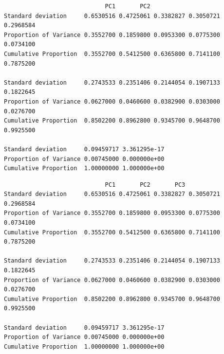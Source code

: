 \documentclass[
  letterpaper,
  DIV=11,
  numbers=noendperiod]{scrartcl}
\newenvironment{Shaded}{}{}
\newcommand{\CommentTok}[1]{\textcolor[rgb]{0.57,0.51,0.45}{#1}}
\newcommand{\FunctionTok}[1]{\textcolor[rgb]{0.41,0.62,0.42}{#1}}
\newcommand{\NormalTok}[1]{\textcolor[rgb]{0.24,0.22,0.21}{#1}}
\newcommand{\OtherTok}[1]{\textcolor[rgb]{0.41,0.62,0.42}{#1}}
\newcommand{\SpecialCharTok}[1]{\textcolor[rgb]{0.69,0.38,0.53}{#1}}
\begin{document}
\begin{verbatim}
                             PC1       PC2                              
Standard deviation     0.6530516 0.4725061 0.3382827 0.3050721 0.2968584
Proportion of Variance 0.3552700 0.1859800 0.0953300 0.0775300 0.0734100
Cumulative Proportion  0.3552700 0.5412500 0.6365800 0.7141100 0.7875200
                                                                        
Standard deviation     0.2743533 0.2351406 0.2144054 0.1907133 0.1822645
Proportion of Variance 0.0627000 0.0460600 0.0382900 0.0303000 0.0276700
Cumulative Proportion  0.8502200 0.8962800 0.9345700 0.9648700 0.9925500
                                              
Standard deviation     0.09459717 3.361295e-17
Proportion of Variance 0.00745000 0.000000e+00
Cumulative Proportion  1.00000000 1.000000e+00
\end{verbatim}

\begin{Shaded}
\end{Shaded}

\begin{verbatim}
                             PC1       PC2       PC3                    
Standard deviation     0.6530516 0.4725061 0.3382827 0.3050721 0.2968584
Proportion of Variance 0.3552700 0.1859800 0.0953300 0.0775300 0.0734100
Cumulative Proportion  0.3552700 0.5412500 0.6365800 0.7141100 0.7875200
                                                                        
Standard deviation     0.2743533 0.2351406 0.2144054 0.1907133 0.1822645
Proportion of Variance 0.0627000 0.0460600 0.0382900 0.0303000 0.0276700
Cumulative Proportion  0.8502200 0.8962800 0.9345700 0.9648700 0.9925500
                                              
Standard deviation     0.09459717 3.361295e-17
Proportion of Variance 0.00745000 0.000000e+00
Cumulative Proportion  1.00000000 1.000000e+00
\end{verbatim}

\begin{Shaded}
\end{Shaded}
\end{document}
